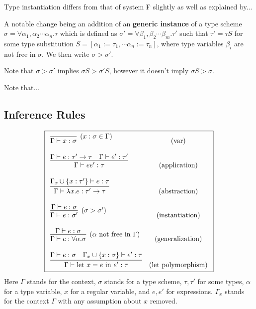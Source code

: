 Type instantiation differs from that of system F slightly as well as explained  by... %

A notable change being an addition of an \textbf{generic instance} of a type scheme $\sigma = \forall \alpha_1, \alpha_2 \cdots \alpha_n . \tau$ which is defined as $\sigma' = \forall \beta_1, \beta_2 \cdots \beta_m . \tau'$ such that $\tau' = \tau S$ for some type substitution $S = [\alpha_1 := \tau_1, \cdots \alpha_n := \tau_n]$, where type variables $\beta_i$ are not free in $\sigma$. We then write $\sigma > \sigma'$.

Note that $\sigma > \sigma'$ implies $\sigma S > \sigma' S$, however it doesn't imply $\sigma S > \sigma$.

Note that... %

\subsection{Inference Rules}

\begin{defn}
    $$\boxed{\begin{array}{l c}
        \infer[(x : \sigma \in \Gamma)]{\Gamma \vdash x : \sigma}{} & (\text{var}) \\\\
        \infer{\Gamma \vdash e e' : \tau}{\Gamma \vdash e : \tau' \rightarrow \tau \quad \Gamma \vdash e' : \tau'} & (\text{application}) \\\\
        \infer{\Gamma \vdash \lambda x . e : \tau' \rightarrow \tau}{\Gamma_x \cup \{x : \tau'\} \vdash e : \tau} & (\text{abstraction}) \\\\
        \infer[(\sigma > \sigma')]{\Gamma \vdash e : \sigma'}{\Gamma \vdash e : \sigma} & (\text{instantiation}) \\\\
        \infer[(\alpha \text{ not free in }\Gamma)]{\Gamma \vdash e : \forall \alpha . \sigma}{\Gamma \vdash e : \sigma} & (\text{generalization}) \\\\
        \infer{\Gamma \vdash \text{let } x = e \text{ in } e' : \tau}{\Gamma \vdash e : \sigma \quad \Gamma_x \cup \{x :\sigma\} \vdash e' : \tau} & (\text{let polymorphism})
    \end{array}}$$
    Here $\Gamma$ stands for the context, $\sigma$ stands for a type scheme, $\tau, \tau'$ for some types, $\alpha$ for a type variable, $x$ for a regular variable, and $e, e'$ for expressions. $\Gamma_x$ stands for the context $\Gamma$ with any assumption about $x$ removed.
\end{defn}


